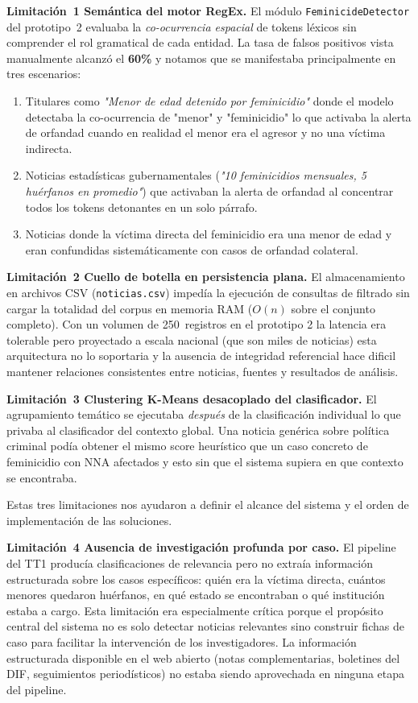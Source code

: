 \textbf{Limitación~1 Semántica del motor RegEx.}
El módulo \texttt{FeminicideDetector} del prototipo~2 evaluaba la \textit{co-ocurrencia
espacial} de tokens léxicos sin comprender el rol gramatical de cada entidad. La tasa
de falsos positivos vista manualmente alcanzó el \textbf{60\%} y notamos que se manifestaba
principalmente en tres escenarios: 
\begin{enumerate}
    \item Titulares como \textit{"Menor de edad detenido por feminicidio"}
          donde el modelo detectaba la co-ocurrencia de "menor" y "feminicidio"
          lo que activaba la alerta de orfandad cuando en realidad el menor era
          el agresor y no una víctima indirecta.
    \item Noticias estadísticas gubernamentales (\textit{"10 feminicidios mensuales,
          5 huérfanos en promedio"}) que activaban la alerta de orfandad al concentrar
          todos los tokens detonantes en un solo párrafo.
    \item Noticias donde la víctima directa del feminicidio era una menor
          de edad y eran confundidas sistemáticamente con casos de orfandad colateral.
\end{enumerate}

\textbf{Limitación~2 Cuello de botella en persistencia plana.}
El almacenamiento en archivos CSV (\texttt{noticias.csv}) impedía la ejecución de
consultas de filtrado sin cargar la totalidad del corpus en memoria RAM
($O(n)$ sobre el conjunto completo). Con un volumen de 250~registros en el prototipo 2
la latencia era tolerable pero proyectado a escala nacional (que son miles de noticias)
esta arquitectura no lo soportaria y la ausencia de integridad referencial
hace dificil mantener relaciones consistentes entre noticias, fuentes y resultados de
análisis.

\textbf{Limitación~3 Clustering K-Means desacoplado del clasificador.}
El agrupamiento temático se ejecutaba \textit{después} de la clasificación individual lo
que privaba al clasificador del contexto global. Una noticia genérica sobre política
criminal podía obtener el mismo score heurístico que un caso concreto de feminicidio
con NNA afectados y esto sin que el sistema supiera en que contexto se encontraba.

Estas tres limitaciones nos ayudaron a definir el alcance del sistema y el orden de
implementación de las soluciones.

\textbf{Limitación~4 Ausencia de investigación profunda por caso.}
El pipeline del TT1 producía clasificaciones de relevancia pero no extraía
información estructurada sobre los casos específicos: quién era la víctima directa,
cuántos menores quedaron huérfanos, en qué estado se encontraban o qué institución
estaba a cargo. Esta limitación era especialmente crítica porque el propósito
central del sistema no es solo detectar noticias relevantes sino construir fichas
de caso para facilitar la intervención de los investigadores. La información estructurada
disponible en el web abierto (notas complementarias, boletines del DIF, seguimientos
periodísticos) no estaba siendo aprovechada en ninguna etapa del pipeline.


